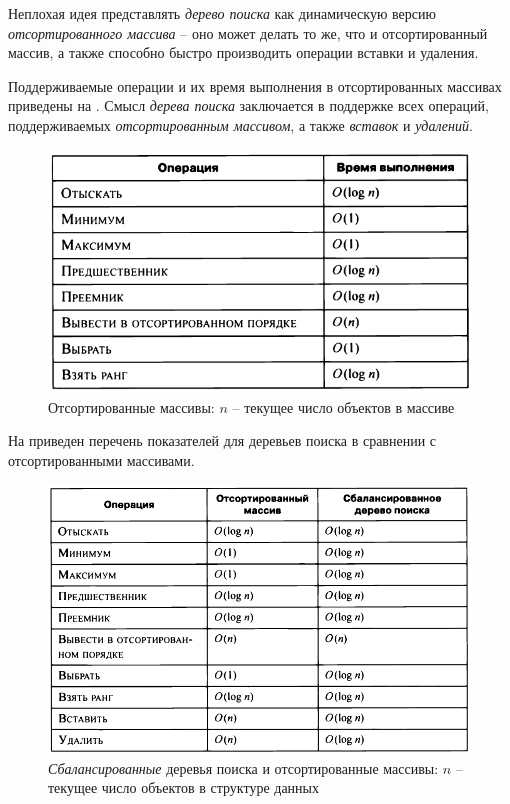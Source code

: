 \documentclass[%
	11pt,
	a4paper,
	utf8,
		]{article}
\begin{document}
Неплохая идея представлять \emph{дерево поиска} как динамическую версию \emph{отсортированного массива} -- оно может делать то же, что и отсортированный массив, а также способно быстро производить операции вставки и удаления.

Поддерживаемые операции и их время выполнения в отсортированных массивах приведены на . Смысл \emph{\color{blue}дерева поиска} заключается в поддержке всех операций, поддерживаемых \emph{\color{blue}отсортированным массивом}, а также \emph{вставок} и \emph{удалений}.

\begin{figure}[h]
	\centering
	\includegraphics[scale=0.65]{figures/tree_search.png}
	\caption{ Отсортированные массивы: $ n $ -- текущее число объектов в массиве }\label{fig:tree_search}
\end{figure}

На  приведен перечень показателей для деревьев поиска в сравнении с отсортированными массивами.

\begin{figure}[h]
	\centering
	\includegraphics[scale=0.65]{figures/tree_search_sorted_array.png}
	\caption{ \emph{Сбалансированные} деревья поиска и отсортированные массивы: $ n $ -- текущее число объектов в структуре данных }\label{fig:tree_search_sorted_array}
\end{figure}
\end{document}
